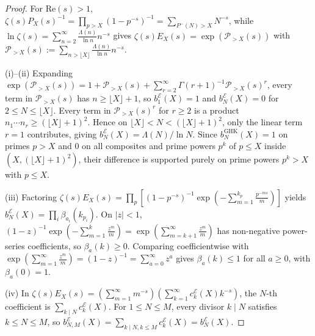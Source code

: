 \documentclass[11pt,reqno]{amsart}
\theoremstyle{definition}
\theoremstyle{remark}
\numberwithin{equation}{section}
\newcommand{\Rea}{\mathrm{Re}}
\begin{document}
\begin{proof}
For $\Rea(s) > 1$, $\zeta(s)P_X(s)^{-1} = \prod_{p > X}(1 - p^{-s})^{-1} = \sum_{P^-(N) > X} N^{-s}$, while $\ln\zeta(s) = \sum_{n=2}^{\infty} \frac{\Lambda(n)}{\ln n}n^{-s}$ gives $\zeta(s)E_X(s) = \exp(\mathcal{P}_{>X}(s))$ with $\mathcal{P}_{>X}(s) := \sum_{n > \lfloor X\rfloor} \frac{\Lambda(n)}{\ln n}n^{-s}$.

(i)--(ii) Expanding $\exp(\mathcal{P}_{>X}(s)) = 1 + \mathcal{P}_{>X}(s) + \sum_{r=2}^{\infty} \Gamma(r+1)^{-1}\mathcal{P}_{>X}(s)^r$, every term in $\mathcal{P}_{>X}(s)$ has $n \ge \lfloor X\rfloor + 1$, so $b_1^{\mathcal{E}}(X) = 1$ and $b_N^{\mathcal{E}}(X) = 0$ for $2 \le N \le \lfloor X\rfloor$. Every term in $\mathcal{P}_{>X}(s)^r$ for $r \ge 2$ is a product $n_1 \cdots n_r \ge (\lfloor X\rfloor + 1)^2$. Hence on $\lfloor X\rfloor < N < (\lfloor X\rfloor + 1)^2$, only the linear term $r = 1$ contributes, giving $b_N^{\mathcal{E}}(X) = \Lambda(N)/\ln N$. Since $b_N^{\mathrm{GHK}}(X) = 1$ on primes $p > X$ and $0$ on all composites and prime powers $p^k$ of $p \le X$ inside $(X, (\lfloor X\rfloor+1)^2)$, their difference is supported purely on prime powers $p^k > X$ with $p \le X$.

(iii) Factoring $\zeta(s)E_X(s) = \prod_p [(1 - p^{-s})^{-1}\exp(-\sum_{m=1}^{k_p} \frac{p^{-ms}}{m})]$ yields $b_N^{\mathcal{E}}(X) = \prod_i \beta_{a_i}(k_{p_i})$. On $\lvert z\rvert < 1$, $(1-z)^{-1}\exp(-\sum_{m=1}^k \frac{z^m}{m}) = \exp(\sum_{m=k+1}^{\infty} \frac{z^m}{m})$ has non-negative power-series coefficients, so $\beta_a(k) \ge 0$. Comparing coefficientwise with $\exp(\sum_{m=1}^{\infty} \frac{z^m}{m}) = (1-z)^{-1} = \sum_{a=0}^{\infty} z^a$ gives $\beta_a(k) \le 1$ for all $a \ge 0$, with $\beta_a(0) = 1$.

(iv) In $\zeta(s)E_X(s) = (\sum_{m=1}^{\infty} m^{-s})(\sum_{k=1}^{\infty} c_k^{\mathcal{E}}(X)k^{-s})$, the $N$-th coefficient is $\sum_{k \mid N} c_k^{\mathcal{E}}(X)$. For $1 \le N \le M$, every divisor $k \mid N$ satisfies $k \le N \le M$, so $b_{N,M}^{\mathcal{E}}(X) = \sum_{k \mid N, k \le M} c_k^{\mathcal{E}}(X) = b_N^{\mathcal{E}}(X)$.
\end{proof}
\end{document}
